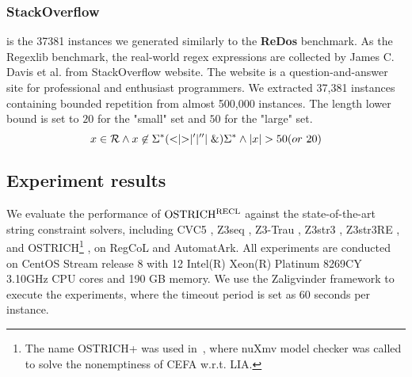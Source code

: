 {\subsubsection{StackOverflow} is the 37381 instances we generated similarly to the \textbf{ReDos} benchmark. As the Regexlib benchmark, the real-world regex expressions are collected by James C. Davis et al.\cite{regex_lingua_franca} from StackOverflow website\cite{stackoverflow}. The website is a question-and-answer site for professional and enthusiast programmers. We extracted 37,381 instances containing bounded repetition from almost 500,000 instances. The length lower bound is set to $20$ for the "small" set and $50$ for the "large" set.
\begin{equation} \label{eq:template}
  x\in \mathcal{R} \wedge x\not\in \Sigma^*(<\mid >\mid '\mid ''\mid \&)\Sigma^*\wedge |x| > 50(or \ 20)
\end{equation}
}

\vspace{-3mm}
\subsection{Experiment results}

We evaluate the performance of $\rm OSTRICH^{RECL}$ against the state-of-the-art string constraint solvers, including CVC5 
\cite{cvc5}, Z3seq \cite{z3seq}, Z3-Trau 
\cite{z3trau}, Z3str3
\cite{z3str3}, Z3str3RE \cite{z3str3re}, and OSTRICH\footnote{The name OSTRICH+ was used in~\cite{atva2020}, where nuXmv model checker was called to solve the nonemptiness of CEFA w.r.t. LIA. } 
\cite{atva2020}, on RegCoL and AutomatArk. All experiments are conducted on CentOS Stream release 8 with 12 Intel(R) Xeon(R) Platinum 8269CY 3.10GHz CPU cores and 190 GB memory. We use the Zaligvinder framework \cite{zaligvinder_2021} to execute the experiments, where the timeout period is set as 60 seconds per instance. 

%

